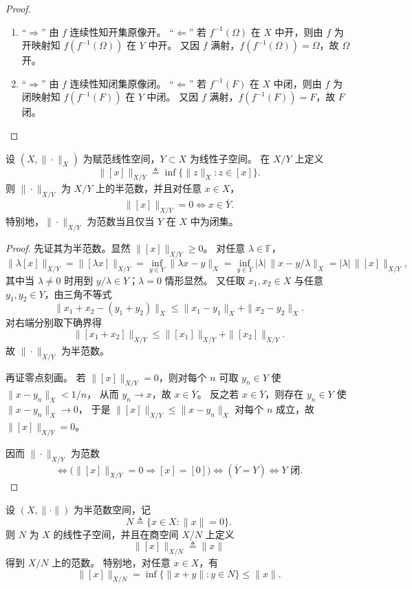 \documentclass[lang=cn,a4paper,newtx,section]{elegantbook}
\begin{document}
\begin{proof}
  \begin{enumerate}
    \item “$\Rightarrow$” 由 $f$ 连续性知开集原像开。
    “$\Leftarrow$” 若 $f^{-1}(\Omega)$ 在 $X$ 中开，则由 $f$ 为开映射知 $f(f^{-1}(\Omega))$ 在 $Y$ 中开。
    又因 $f$ 满射，$f(f^{-1}(\Omega))=\Omega$，故 $\Omega$ 开。

    \item “$\Rightarrow$” 由 $f$ 连续性知闭集原像闭。
    “$\Leftarrow$” 若 $f^{-1}(F)$ 在 $X$ 中闭，则由 $f$ 为闭映射知 $f(f^{-1}(F))$ 在 $Y$ 中闭。
    又因 $f$ 满射，$f(f^{-1}(F))=F$，故 $F$ 闭。
  \end{enumerate}
\end{proof}

\begin{proposition}
  设 $(X,\|\cdot\|_X)$ 为赋范线性空间，$Y\subset X$ 为线性子空间。
  在 $X/Y$ 上定义
  \[
    \|[x]\|_{X/Y}\triangleq \inf\{\|z\|_X: z\in[x]\}.
  \]
  则 $\|\cdot\|_{X/Y}$ 为 $X/Y$ 上的半范数，并且对任意 $x\in X$，
  \[
    \|[x]\|_{X/Y}=0 \iff x\in\overline{Y}.
  \]
  特别地，$\|\cdot\|_{X/Y}$ 为范数当且仅当 $Y$ 在 $X$ 中为闭集。
\end{proposition}

\begin{proof}
  先证其为半范数。显然 $\|[x]\|_{X/Y}\ge0$。
  对任意 $\lambda\in\mathbb{F}$，
  \[
    \|\lambda[x]\|_{X/Y}
    =\|[\lambda x]\|_{X/Y}
    =\inf_{y\in Y}\|\lambda x-y\|_X
    =\inf_{y\in Y}|\lambda|\,\|x-y/\lambda\|_X
    =|\lambda|\,\|[x]\|_{X/Y},
  \]
  其中当 $\lambda\ne0$ 时用到 $y/\lambda\in Y$；$\lambda=0$ 情形显然。
  又任取 $x_1,x_2\in X$ 与任意 $y_1,y_2\in Y$，由三角不等式
  \[
    \|x_1+x_2-(y_1+y_2)\|_X\le \|x_1-y_1\|_X+\|x_2-y_2\|_X.
  \]
  对右端分别取下确界得
  \[
    \|[x_1+x_2]\|_{X/Y}\le \|[x_1]\|_{X/Y}+\|[x_2]\|_{X/Y}.
  \]
  故 $\|\cdot\|_{X/Y}$ 为半范数。

  再证零点刻画。
  若 $\|[x]\|_{X/Y}=0$，则对每个 $n$ 可取 $y_n\in Y$ 使 $\|x-y_n\|_X<1/n$，
  从而 $y_n\to x$，故 $x\in\overline{Y}$。
  反之若 $x\in\overline{Y}$，则存在 $y_n\in Y$ 使 $\|x-y_n\|_X\to0$，
  于是 $\|[x]\|_{X/Y}\le \|x-y_n\|_X$ 对每个 $n$ 成立，故 $\|[x]\|_{X/Y}=0$。

  因而 $\|\cdot\|_{X/Y}$ 为范数
  \[
    \iff \bigl(\|[x]\|_{X/Y}=0\Rightarrow [x]=[0]\bigr)
    \iff (\overline{Y}=Y)
    \iff Y\text{ 闭}.
  \]
\end{proof}
\begin{proposition}
  设 $(X,\|\cdot\|)$ 为半范数空间，记
  \[
    N\triangleq \{x\in X:\|x\|=0\}.
  \]
  则 $N$ 为 $X$ 的线性子空间，并且在商空间 $X/N$ 上定义
  \[
    \|[x]\|_{X/N}\triangleq \|x\|
  \]
  得到 $X/N$ 上的范数。
  特别地，对任意 $x\in X$，有
  \[
    \|[x]\|_{X/N}=\inf\{\|x+y\|:y\in N\}\le \|x\|.
  \]
\end{proposition}
\end{document}
